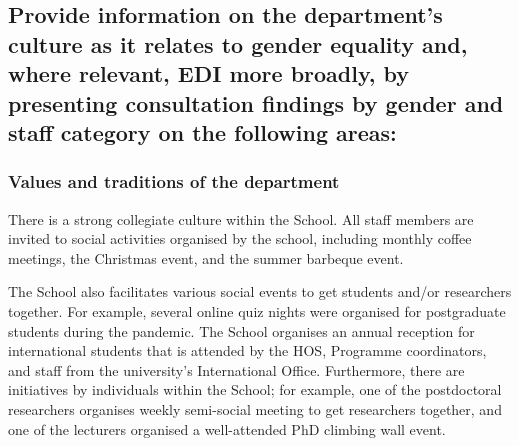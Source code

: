 
\subsection{Provide information on the department’s culture as it relates to gender equality and, where relevant, EDI more broadly, by presenting consultation findings by gender and staff category on the following areas:}

\subsubsection{Values and traditions of the department}
There is a strong collegiate culture within the School. 
All staff members are invited to social activities organised by the school, including monthly coffee meetings, the Christmas event, and the summer barbeque event. 

The School also facilitates various social events to get students and/or researchers together. For example, several online quiz nights were organised for postgraduate students during the pandemic. The School organises an annual reception for international students that is attended by the \ac{HOS}, Programme coordinators, and staff from the university's International Office. Furthermore, there are initiatives by individuals within the School; for example, one of the postdoctoral researchers organises weekly semi-social meeting to get researchers together, and one of the lecturers organised a well-attended PhD climbing wall event.


